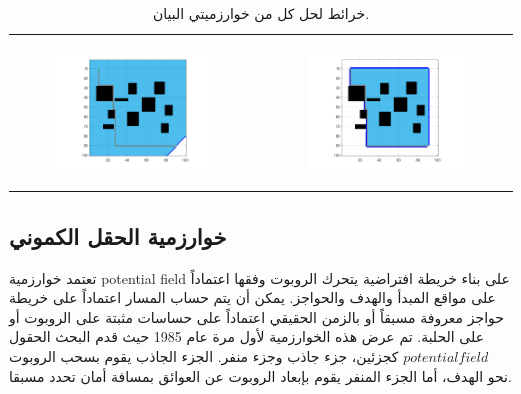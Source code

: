 \begin{table}
	\centering
	\begin{tabular}{cc}
		
		\begin{subfigure}{0.4\textwidth}
			\centering
			\includegraphics[width=0.9\linewidth]{figs/10/fig10_2}
		\end{subfigure}&
	
		\begin{subfigure}{0.4\textwidth}
			\centering
			\includegraphics[width=0.9\linewidth]{figs/10/fig10_3}
		\end{subfigure}
	\end{tabular}
	\caption{خرائط لحل كل من خوارزميتي البيان.}
	\label{10:fig:graph}
\end{table}

\subsection{خوارزمية الحقل الكموني}
تعتمد خوارزمية \textenglish{potential field} على بناء خريطة افتراضية يتحرك الروبوت وفقها اعتماداً على مواقع المبدأ والهدف والحواجز. يمكن أن يتم حساب المسار اعتماداً على خريطة حواجز معروفة مسبقاً أو بالزمن الحقيقي اعتماداً على حساسات مثبتة على الروبوت أو على الحلبة. تم عرض هذه الخوارزمية لأول مرة عام 1985 \cite{b8} حيث قدم البحث الحقول $ potential field $ كجزئين، جزء جاذب وجزء منفر. الجزء الجاذب يقوم بسحب الروبوت نحو الهدف، أما الجزء المنفر يقوم بإبعاد الروبوت عن العوائق بمسافة أمان تحدد مسبقا. 

